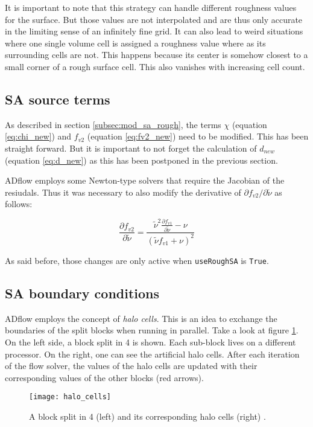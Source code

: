 \noindent It is important to note that this strategy can handle different
roughness values for the surface. But those values are not interpolated and are
thus only accurate in the limiting sense of an infinitely fine grid. It can also
lead to weird situations where one single volume cell is assigned a roughness
value where as its surrounding cells are not. This happens because its center is
somehow closest to a small corner of a rough surface cell. This also vanishes
with increasing cell count.

\subsection{SA source terms}
As described in section \ref{subsec:mod_sa_rough}, the terms $\chi$ (equation
\ref{eq:chi_new}) and $f_{v2}$ (equation \ref{eq:fv2_new}) need to be modified.
This has been straight forward. But it is important to not forget the
calculation of $d_{new}$ (equation \ref{eq:d_new}) as this has been postponed in
the previous section.

ADflow employs some Newton-type solvers that require the Jacobian of the
resiudals. Thus it was necessary to also modify the derivative of
$\partial f_{v2} / \partial \tilde \nu$ as follows:

\begin{equation}
  \frac{\partial f_{v2}}{\partial \tilde \nu} =
  \frac{\tilde \nu^{2} \frac{\partial f_{v1}}{\partial \tilde \nu} - \nu}
  {(\tilde \nu f_{v1} + \nu)^{2}}
\end{equation}

\noindent As said before, those changes are only active when \texttt{useRoughSA}
is \texttt{True}.

\subsection{SA boundary conditions}
ADflow employs the concept of \textit{halo cells}. This is an idea to exchange
the boundaries of the split blocks when running in parallel. Take a look at
figure \ref{fig:halo_cells}. On the left side, a block split in 4 is shown. Each
sub-block lives on a different processor. On the right, one can see the
artificial halo cells. After each iteration of the flow solver, the values of
the halo cells are updated with their corresponding values of the other blocks
(red arrows).

\begin{figure}[H] \centering
\texttt{[image: halo\_cells]}
    \caption{A block split in 4 (left) and its corresponding halo cells (right)
            \cite{cfd_halo}.}
    \label{fig:halo_cells}
\end{figure}

